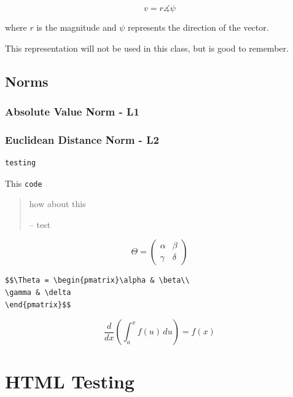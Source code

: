 \documentclass[
]{book}
\theoremstyle{definition}
\theoremstyle{definition}
\theoremstyle{definition}
\theoremstyle{definition}
\theoremstyle{remark}
\begin{document}
\[v = r\measuredangle \psi\]

where \(r\) is the magnitude and \(\psi\) represents the direction of the vector.

This representation will not be used in this class, but is good to remember.

\hypertarget{norms}{%
\section{Norms}\label{norms}}

\hypertarget{absolute-value-norm---l1}{%
\subsection{Absolute Value Norm - L1}\label{absolute-value-norm---l1}}

\hypertarget{euclidean-distance-norm---l2}{%
\subsection{Euclidean Distance Norm - L2}\label{euclidean-distance-norm---l2}}

\begin{verbatim}
testing
\end{verbatim}

This \texttt{code}

\begin{quote}
how about this

-- test
\end{quote}

\[\Theta = \begin{pmatrix}\alpha & \beta\\
\gamma & \delta
\end{pmatrix}\]

\begin{verbatim}
$$\Theta = \begin{pmatrix}\alpha & \beta\\
\gamma & \delta
\end{pmatrix}$$
\end{verbatim}

\begin{equation*} 
\frac{d}{dx}\left( \int_{a}^{x} f(u)\,du\right)=f(x)
\end{equation*}

\hypertarget{html-testing}{%
\chapter{HTML Testing}\label{html-testing}}
\end{document}
